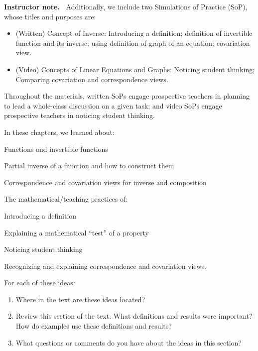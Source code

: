 \documentclass[11pt]{article}
\newenvironment{bignote}[1][Instructor note]%
	{\begin{mdframed}\raggedright{\bf #1.~}}
	{\end{mdframed}}
\theoremstyle{definition}
\begin{document}
\begin{bignote}
Additionally, we include two Simulations of Practice (SoP), whose titles and purposes are:
	\begin{itemize}
	\item (Written) Concept of Inverse: Introducing a definition; definition of invertible function and its inverse; using definition of graph of an equation; covariation view.
	\item (Video) Concepts of Linear Equations and Graphs: Noticing student thinking; Comparing covariation and correspondence views.
	\end{itemize}
	
Throughout the \MODULES materials, written SoPs engage prospective teachers in planning to lead a whole-class discussion on a given task; and video SoPs engage prospective teachers in noticing student thinking.
\end{bignote}


\begin{enumerate}
\setcounter{enumi}{-1}
\item In these chapters, we learned about:
	\end{itemize*}
	For each of these ideas: 
	\begin{enumerate}
	\item Where in the text are these ideas located?
	\item Review this section of the text. What definitions and results were important? How do examples use these definitions and results?
	\item What questions or comments do you have about the ideas in this section?
	\end{enumerate}
\end{enumerate}
\end{document}
